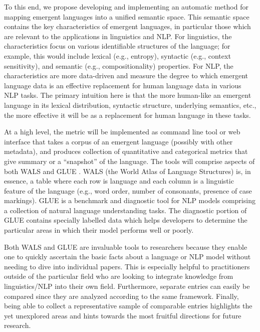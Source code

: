 To this end, we propose developing and implementing an automatic method for mapping emergent languages  into a unified semantic space.
This semantic space contains the key characteristics of emergent languages, in particular those which are relevant to the applications in linguistics and NLP.\sentspace{}
For linguistics, the characteristics focus on various identifiable structures of the language; for example, this would include lexical (e.g., entropy), syntactic (e.g., context sensitivity), and semantic (e.g., compositionality) properties.
For NLP, the characteristics are more data-driven and measure the degree to which emergent language data is an effective replacement for human language data in various NLP tasks.
The primary intuition here is that the more human-like an emergent language in its lexical distribution, syntactic structure, underlying semantics, etc., the more effective it will be as a replacement for human language in these tasks.

At a high level, the metric will be implemented as command line tool or web interface that takes a corpus of an emergent language (possibly with other metadata), and produces collection of quantitative and categorical metrics that give summary or a ``snapshot'' of the language.
The tools will comprise aspects of both WALS \citep{wals} and GLUE \citep{wang2018glue}.
WALS (the World Atlas of Language Structures) \citep{wals} is, in essence, a table where each row is language and each column is a linguistic feature of the language (e.g., word order, number of consonants, presence of case markings).
GLUE \citep{wang2018glue} is a benchmark and diagnostic tool for NLP models comprising a collection of natural language understanding tasks.
The diagnostic portion of GLUE contains specially labelled data which helps developers to determine the particular areas in which their model performs well or poorly.

Both WALS and GLUE are invaluable tools to researchers because they enable one to quickly ascertain the basic facts about a language or NLP model without needing to dive into individual papers.
This is especially helpful to practitioners outside of the particular field who are looking to integrate knowledge from linguistics/NLP into their own field.
Furthermore, separate entries can easily be compared since they are analyzed according to the same framework.
Finally, being able to collect a representative sample of comparable entries highlights the yet unexplored areas and hints towards the most fruitful directions for future research.

